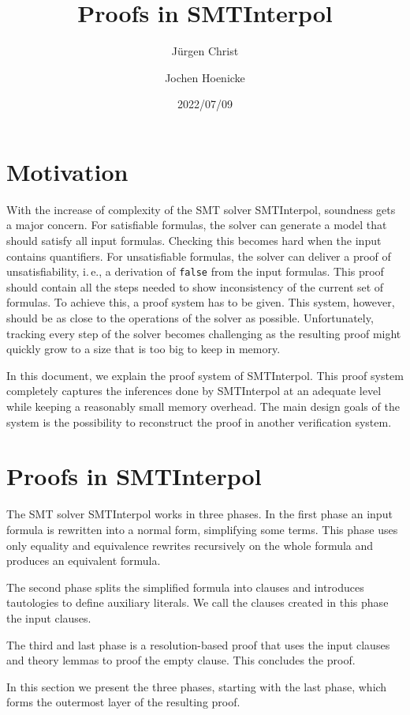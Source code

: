\documentclass[a4paper]{article}
\title{Proofs in SMTInterpol}
\author{J{\"u}rgen Christ \and Jochen Hoenicke}
\date{2022/07/09}
\newcommand\si{SMTInterpol\xspace}
\begin{document}
\maketitle

\section{Motivation}
With the increase of complexity of the SMT solver \si, soundness gets a major
concern.  For satisfiable formulas, the solver can generate a model that
should satisfy all input formulas.  Checking this becomes hard when the input
contains quantifiers.  For unsatisfiable formulas, the solver can deliver a
proof of unsatisfiability, i.\,e., a derivation of \texttt{false} from the
input formulas.  This proof should contain all the steps needed to show
inconsistency of the current set of formulas.  To achieve this, a proof system
has to be given.  This system, however, should be as close to the operations
of the solver as possible.  Unfortunately, tracking every step of the solver
becomes challenging as the resulting proof might quickly grow to a size that is
too big to keep in memory.

In this document, we explain the proof system of \si.  This proof
system completely captures the inferences done by \si at an adequate
level while keeping a reasonably small memory overhead.  The main
design goals of the system is the possibility to reconstruct the proof
in another verification system.

\section{Proofs in \si}

The SMT solver \si works in three phases.  In the first phase an input
formula is rewritten into a normal form, simplifying some terms.  This
phase uses only equality and equivalence rewrites recursively on the
whole formula and produces an equivalent formula.

The second phase splits the simplified formula into clauses and
introduces tautologies to define auxiliary literals.  We call the clauses
created in this phase the input clauses.

The third and last phase is a resolution-based proof that uses the
input clauses and theory lemmas to proof the empty clause.  This
concludes the proof.

In this section we present the three phases, starting with the last
phase, which forms the outermost layer of the resulting proof.
\end{document}
